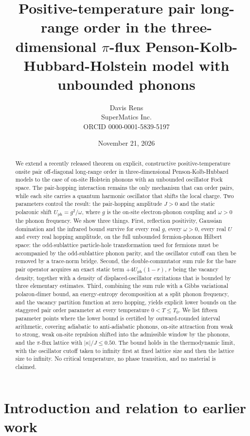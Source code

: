 \documentclass[11pt]{article}
\title{Positive-temperature pair long-range order in the three-dimensional
$\pi$-flux Penson-Kolb-Hubbard-Holstein model with unbounded phonons}
\author{Davis Rens\\SuperMatics Inc.\\ORCID 0000-0001-5839-5197}
\date{November 21, 2026}
\numberwithin{equation}{section}
\theoremstyle{definition}
\begin{document}
\maketitle

\begin{abstract}
We extend a recently released theorem on explicit, constructive positive-temperature
onsite pair off-diagonal long-range order in three-dimensional Penson-Kolb-Hubbard
models to the case of on-site Holstein phonons with an unbounded oscillator Fock
space. The pair-hopping interaction remains the only mechanism that can order pairs,
while each site carries a quantum harmonic oscillator that shifts the local charge.
Two parameters control the result: the pair-hopping amplitude $J>0$ and the static
polaronic shift $U_{\mathrm{ph}}=g^{2}/\omega$, where $g$ is the on-site
electron-phonon coupling and $\omega>0$ the phonon frequency. We show three things.
First, reflection positivity, Gaussian domination and the infrared bound survive for
every real $g$, every $\omega>0$, every real $U$ and every real hopping amplitude, on
the full unbounded fermion-phonon Hilbert space: the odd-sublattice particle-hole
transformation used for fermions must be accompanied by the odd-sublattice phonon
parity, and the oscillator cutoff can then be removed by a trace-norm bridge.
Second, the double-commutator sum rule for the bare pair operator acquires an exact
static term $+4U_{\mathrm{ph}}(1-r)$, $r$ being the vacancy density, together with a
density of displaced-oscillator excitations that is bounded by three elementary
estimates. Third, combining the sum rule with a Gibbs variational polaron-dimer bound,
an energy-entropy decomposition at a split phonon frequency, and the vacancy
partition function at zero hopping, yields explicit lower bounds on the staggered pair
order parameter at every temperature $0<T\le T_0$. We list fifteen parameter points
where the lower bound is certified by outward-rounded interval arithmetic, covering
adiabatic to anti-adiabatic phonons, on-site attraction from weak to strong, weak on-site
repulsion shifted into the admissible window by the phonons, and the $\pi$-flux lattice
with $|\kappa|/J\le 0.50$. The bound holds in the thermodynamic limit, with
the oscillator cutoff taken to infinity first at fixed lattice size and then the
lattice size to infinity. No critical temperature, no phase transition, and no
material is claimed.
\end{abstract}

\tableofcontents

\section{Introduction and relation to earlier work}\label{sec:intro}
\end{document}
